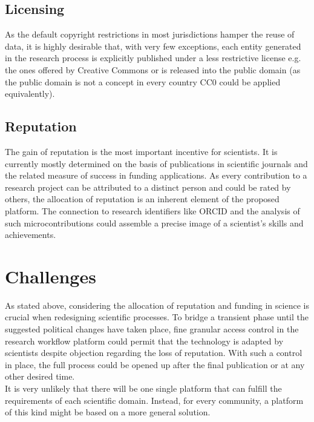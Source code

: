 \documentclass{article}
\begin{document}
\subsection{Licensing}

As the default copyright restrictions in most jurisdictions hamper the
reuse of data, it is highly desirable that, with very few exceptions,
each entity generated in the research process is explicitly published
under a less restrictive license e.g. the ones offered by Creative
Commons \cite{CC} or is released into the public domain (as the public
domain is not a concept in every country CC0 \cite{CC0} could be applied
equivalently).

\subsection{Reputation}

The gain of reputation is the most important incentive for
scientists. It is currently mostly determined on the basis of
publications in scientific journals and the related measure of success
in funding applications. As every contribution to a research project
can be attributed to a distinct person and could be rated by others,
the allocation of reputation is an inherent element of the proposed
platform. The connection to research identifiers like ORCID \cite{ORCID} and
the analysis of such microcontributions could assemble a precise image
of a scientist's skills and achievements.


\section{Challenges}

As stated above, considering the allocation of reputation and funding
in science is crucial when redesigning scientific processes. To bridge
a transient phase until the suggested political changes have taken
place, fine granular access control in the research workflow platform
could permit that the technology is adapted by scientists despite
objection regarding the loss of reputation. With such a control in
place, the full process could be opened up after the final publication
or at any other desired time.\\

It is very unlikely that there will be one single platform that can
fulfill the requirements of each scientific domain. Instead, for every
community, a platform of this kind might be based on a more general
solution.
\end{document}
